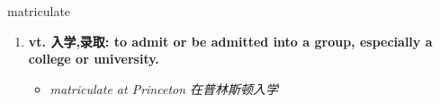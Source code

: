 
\begin{frame}
{\huge matriculate}
\begin{center}
\begin{enumerate}\Large
  \item \textbf{vt. 入学,录取: to admit or be admitted into a group, especially a college or university.}
  \begin{itemize}
    \item \em{\Large{matriculate at Princeton 在普林斯顿入学}}
  \end{itemize}
\end{enumerate}
\end{center}
\end{frame}
